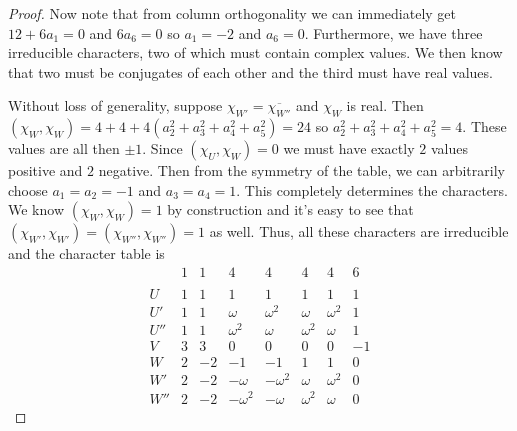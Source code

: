 \documentclass{article}
\begin{document}
\begin{proof}
Now note that from column orthogonality we can immediately get $12 + 6a_1 = 0$ and $6a_6 = 0$ so $a_1 = -2$ and $a_6 = 0$. Furthermore, we have three irreducible characters, two of which must contain complex values. We then know that two must be conjugates of each other and the third must have real values.

Without loss of generality, suppose $\chi_{W'} = \overline{\chi_{W''}}$ and $\chi_W$ is real. Then $(\chi_W, \chi_W) = 4 + 4 + 4(a_2^2 + a_3^2 + a_4^2 + a_5^2) = 24$ so $a_2^2 + a_3^2 + a_4^2 + a_5^2 = 4$. These values are all then $\pm 1$. Since $(\chi_U, \chi_W) = 0$ we must have exactly $2$ values positive and $2$ negative. Then from the symmetry of the table, we can arbitrarily choose $a_1 = a_2 = -1$ and $a_3 = a_4 = 1$. This completely determines the characters. We know $(\chi_W, \chi_W) = 1$ by construction and it's easy to see that $(\chi_{W'}, \chi_{W'}) = (\chi_{W''}, \chi_{W''}) = 1$ as well. Thus, all these characters are irreducible and the character table is
\[
\begin{array}{r|rrrrrrr}
& 1 & 1 & 4 & 4 & 4 & 4 & 6\\
&&&&&&&\\\hline
U & 1 & 1 & 1 & 1 & 1 & 1 & 1\\
U' & 1 & 1 & \omega & \omega^2 & \omega & \omega^2 & 1\\
U'' & 1 & 1 & \omega^2 & \omega & \omega^2 & \omega & 1\\
V & 3 & 3 & 0 & 0 & 0 & 0 & -1\\
W & 2 & -2 & -1 & -1 & 1 & 1 & 0\\
W' & 2 & -2 & -\omega & -\omega^2 & \omega & \omega^2 & 0\\
W'' & 2 & -2 & -\omega^2 & -\omega & \omega^2 & \omega & 0
\end{array}
\]
\end{proof}
\end{document}

